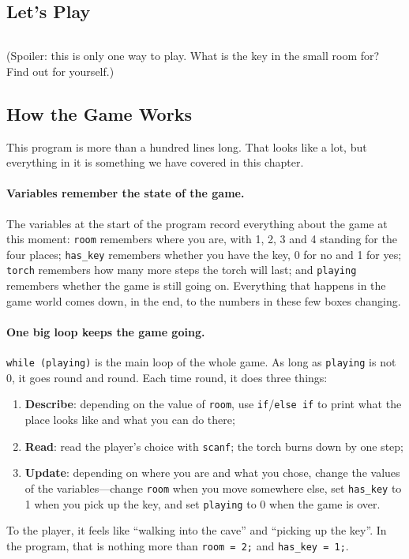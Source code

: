 
\subsection{Let's Play}

\inputminted[linenos=false]{text}{code/en/ch02/out/dragon.txt}

(Spoiler: this is only one way to play. What is the key in the small room for? Find out for yourself.)

\subsection{How the Game Works}

This program is more than a hundred lines long. That looks like a lot, but everything in it is something we have covered in this chapter.

\paragraph{Variables remember the state of the game.} The variables at the start of the program record everything about the game at this moment: \texttt{room} remembers where you are, with 1, 2, 3 and 4 standing for the four places; \texttt{has\_key} remembers whether you have the key, 0 for no and 1 for yes; \texttt{torch} remembers how many more steps the torch will last; and \texttt{playing} remembers whether the game is still going on. Everything that happens in the game world comes down, in the end, to the numbers in these few boxes changing.

\paragraph{One big loop keeps the game going.} \texttt{while (playing)} is the main loop of the whole game. As long as \texttt{playing} is not 0, it goes round and round. Each time round, it does three things:
\begin{enumerate}
  \item \textbf{Describe}: depending on the value of \texttt{room}, use \texttt{if}/\texttt{else if} to print what the place looks like and what you can do there;
  \item \textbf{Read}: read the player's choice with \texttt{scanf}; the torch burns down by one step;
  \item \textbf{Update}: depending on where you are and what you chose, change the values of the variables---change \texttt{room} when you move somewhere else, set \texttt{has\_key} to 1 when you pick up the key, and set \texttt{playing} to 0 when the game is over.
\end{enumerate}
To the player, it feels like ``walking into the cave'' and ``picking up the key''. In the program, that is nothing more than \texttt{room = 2;} and \texttt{has\_key = 1;}.

